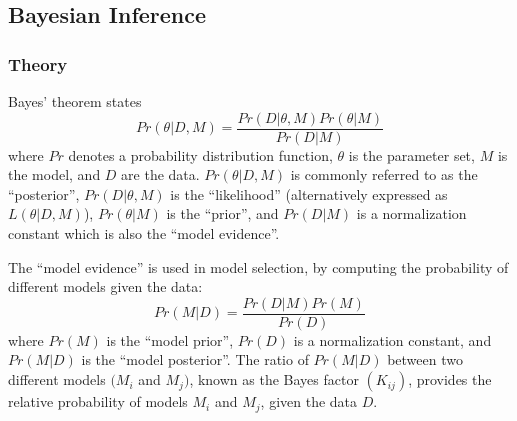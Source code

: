 \documentclass[preprint,letterpaper,floatfix,citeautoscript,aip,jcp]{revtex4-1}
\begin{document}
\subsection{Bayesian Inference} \label{Bayesian Analysis}

\subsubsection{Theory}

Bayes' theorem states
\begin{equation} \label{Bayes Theorem}
Pr(\theta|D,M) = \frac{Pr(D|\theta,M)Pr(\theta|M)}{Pr(D|M)}
\end{equation}
where $Pr$ denotes a probability distribution function, $\theta$ is the parameter set, $M$ is the model, and $D$ are the data. $Pr(\theta|D,M)$ is commonly referred to as the ``posterior'', $Pr(D|\theta,M)$ is the ``likelihood'' (alternatively expressed as $L(\theta|D,M)$), $Pr(\theta|M)$ is the ``prior'', and $Pr(D|M)$ is a normalization constant which is also the ``model evidence''. 


The ``model evidence'' is used in model selection, by computing the probability of different models given the data:
\begin{equation} \label{Model Selection}
Pr(M|D) = \frac{Pr(D|M)Pr(M)}{Pr(D)}
\end{equation}
where $Pr(M)$ is the ``model prior'', $Pr(D)$ is a normalization constant, and $Pr(M|D)$ is the ``model posterior''. The ratio of $Pr(M|D)$ between two different models $(M_i$ and $M_j)$, known as the Bayes factor $(K_{ij})$, provides the relative probability of models $M_i$ and $M_j$, 
given the data $D$. 
\end{document}

